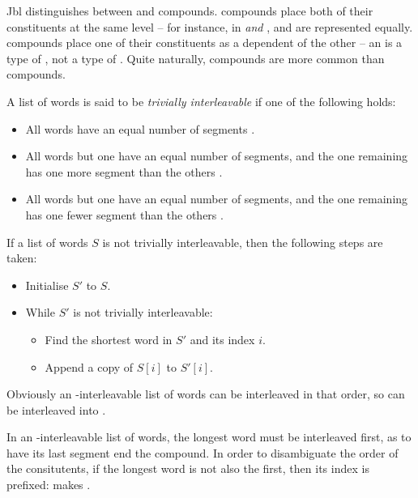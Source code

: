 \documentclass{book}
\newcommand{\lname}{Jbl}
\begin{document}
\lname{} distinguishes between  and  compounds.  compounds place both of their constituents at the same level -- for instance, in \emph{ and },  and  are represented equally.  compounds place one of their constituents as a dependent of the other -- an \emph{} is a type of , not a type of . Quite naturally,  compounds are more common than  compounds.

A list of words is said to be \emph{trivially interleavable} if one of the following holds:

\newcommand{\tieq}{\hlvi{(eq)}}
\newcommand{\tiaug}{\hlvii{(aug)}}
\newcommand{\tidim}{\hlviii{(dim)}}

\begin{itemize}
  \item All words have an equal number of segments \tieq{}.
  \item All words but one have an equal number of segments, and the one remaining has one more segment than the others \tiaug{}.
  \item All words but one have an equal number of segments, and the one remaining has one fewer segment than the others \tidim{}.
\end{itemize}

If a list of words $S$ is not trivially interleavable, then the following steps are taken:

\begin{itemize}
  \item Initialise $S'$ to $S$.
  \item While $S'$ is not trivially interleavable:
  \begin{itemize}
    \item Find the shortest word in $S'$ and its index $i$.
    \item Append a copy of $S[i]$ to $S'[i]$.
  \end{itemize}
\end{itemize}

Obviously an \tieq-interleavable list of words can be interleaved in that order, so  can be interleaved into .

In an \tiaug-interleavable list of words, the longest word must be interleaved first, as to have its last segment end the compound. In order to disambiguate the order of the consitutents, if the longest word is not also the first, then its index is prefixed:  makes .
\end{document}

